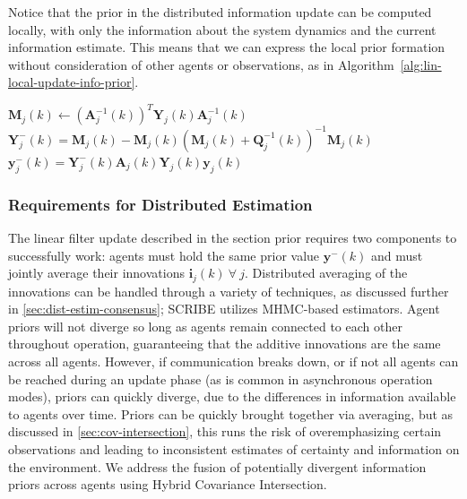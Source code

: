 Notice that the prior in the distributed information update can be computed locally, with only the information about the system dynamics and the current information estimate. This means that we can express the local prior formation without consideration of other agents or observations, as in Algorithm~\ref{alg:lin-local-update-info-prior}.

\begin{algorithm}
    \caption{Linear Local Update for Information Prior}\label{alg:lin-local-update-info-prior}
    $\bm{M}_j(k)\gets\left(\bm{A}_j^{-1}(k)\right)^T\bm{Y}_j(k)\bm{A}_j^{-1}(k)$\;
    $\bm{Y}^{-}_j(k)=\bm{M}_j(k)-\bm{M}_j(k)\left(\bm{M}_j(k)+\bm{Q}_j^{-1}(k)\right)^{-1}\bm{M}_j(k)$\;
    $\bm{y}^{-}_j(k)=\bm{Y}^-_j(k)\bm{A}_j(k)\bm{Y}_j(k)\bm{y}_j(k)$\;
\end{algorithm}

\subsubsection{Requirements for Distributed Estimation}

The linear filter update described in the section prior requires two components to successfully work: agents must hold the same prior value $\mathbf{y}^-(k)$ and must jointly average their innovations $\mathbf{i}_j(k)\ \forall\ j$. Distributed averaging of the innovations can be handled through a variety of techniques, as discussed further in \ref{sec:dist-estim-consensus}; SCRIBE utilizes MHMC-based estimators. Agent priors will not diverge so long as agents remain connected to each other throughout operation, guaranteeing that the additive innovations are the same across all agents. However, if communication breaks down, or if not all agents can be reached during an update phase (as is common in asynchronous operation modes), priors can quickly diverge, due to the differences in information available to agents over time. Priors can be quickly brought together via averaging, but as discussed in \ref{sec:cov-intersection}, this runs the risk of overemphasizing certain observations and leading to inconsistent estimates of certainty and information on the environment. We address the fusion of potentially divergent information priors across agents using Hybrid Covariance Intersection.

